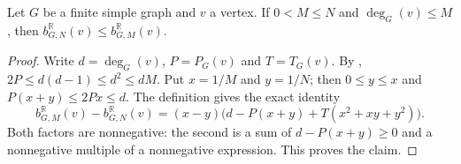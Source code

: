 \begin{lemma}
Let $G$ be a finite simple graph and $v$ a vertex. If
$0<M\le N$ and $\deg_G(v)\le M$, then
$b^{\mathbb R}_{G,N}(v)\le b^{\mathbb R}_{G,M}(v)$.
\end{lemma}
\begin{proof}
Write $d=\deg_G(v)$, $P=P_G(v)$ and $T=T_G(v)$.
By ,
$2P\le d(d-1)\le d^2\le dM$. Put $x=1/M$ and $y=1/N$;
then $0\le y\le x$ and $P(x+y)\le2Px\le d$.
The definition  gives the exact identity
\[
b^{\mathbb R}_{G,M}(v)-b^{\mathbb R}_{G,N}(v)
=(x-y)\bigl(d-P(x+y)+T(x^2+xy+y^2)\bigr).
\]
Both factors are nonnegative: the second is a sum of $d-P(x+y)\ge0$
and a nonnegative multiple of a nonnegative expression. This proves the claim.
\end{proof}

